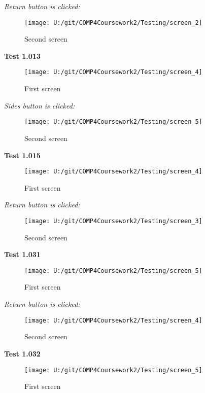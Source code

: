 \textit{Return button is clicked: }

\begin{figure}[H]
    \label{fig: Second Screen}\caption{Second screen}
    \texttt{[image: U:/git/COMP4Coursework2/Testing/screen\_2]}
\end{figure}

\textbf{Test 1.013}

\begin{figure}[H]
    \label{fig: First Screen}\caption{First screen}
    \texttt{[image: U:/git/COMP4Coursework2/Testing/screen\_4]}
\end{figure}

\textit{Sides button is clicked: }

\begin{figure}[H]
    \label{fig: Second Screen}\caption{Second screen}
    \texttt{[image: U:/git/COMP4Coursework2/Testing/screen\_5]}
\end{figure}

\textbf{Test 1.015}

\begin{figure}[H]
    \label{fig: First Screen}\caption{First screen}
    \texttt{[image: U:/git/COMP4Coursework2/Testing/screen\_4]}
\end{figure}

\textit{Return button is clicked: }

\begin{figure}[H]
    \label{fig: Second Screen}\caption{Second screen}
    \texttt{[image: U:/git/COMP4Coursework2/Testing/screen\_3]}
\end{figure}

\textbf{Test 1.031}

\begin{figure}[H]
    \label{fig: First Screen}\caption{First screen}
    \texttt{[image: U:/git/COMP4Coursework2/Testing/screen\_5]}
\end{figure}

\textit{Return button is clicked: }

\begin{figure}[H]
    \label{fig: Second Screen}\caption{Second screen}
    \texttt{[image: U:/git/COMP4Coursework2/Testing/screen\_4]}
\end{figure}

\textbf{Test 1.032}

\begin{figure}[H]
    \label{fig: First Screen}\caption{First screen}
    \texttt{[image: U:/git/COMP4Coursework2/Testing/screen\_5]}
\end{figure}

